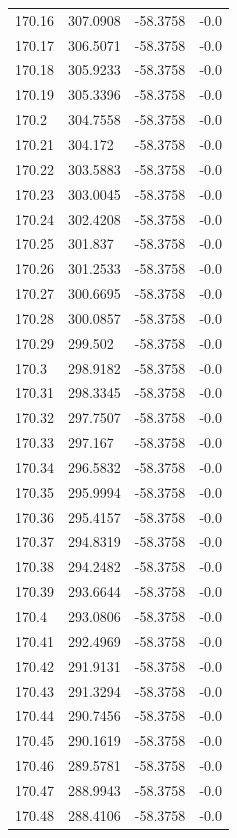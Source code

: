 \begin{table}[H]
\begin{tabular}{llll}
170.16 & 307.0908 & -58.3758 & -0.0 \\
170.17 & 306.5071 & -58.3758 & -0.0 \\
170.18 & 305.9233 & -58.3758 & -0.0 \\
170.19 & 305.3396 & -58.3758 & -0.0 \\
170.2 & 304.7558 & -58.3758 & -0.0 \\
170.21 & 304.172 & -58.3758 & -0.0 \\
170.22 & 303.5883 & -58.3758 & -0.0 \\
170.23 & 303.0045 & -58.3758 & -0.0 \\
170.24 & 302.4208 & -58.3758 & -0.0 \\
170.25 & 301.837 & -58.3758 & -0.0 \\
170.26 & 301.2533 & -58.3758 & -0.0 \\
170.27 & 300.6695 & -58.3758 & -0.0 \\
170.28 & 300.0857 & -58.3758 & -0.0 \\
170.29 & 299.502 & -58.3758 & -0.0 \\
170.3 & 298.9182 & -58.3758 & -0.0 \\
170.31 & 298.3345 & -58.3758 & -0.0 \\
170.32 & 297.7507 & -58.3758 & -0.0 \\
170.33 & 297.167 & -58.3758 & -0.0 \\
170.34 & 296.5832 & -58.3758 & -0.0 \\
170.35 & 295.9994 & -58.3758 & -0.0 \\
170.36 & 295.4157 & -58.3758 & -0.0 \\
170.37 & 294.8319 & -58.3758 & -0.0 \\
170.38 & 294.2482 & -58.3758 & -0.0 \\
170.39 & 293.6644 & -58.3758 & -0.0 \\
170.4 & 293.0806 & -58.3758 & -0.0 \\
170.41 & 292.4969 & -58.3758 & -0.0 \\
170.42 & 291.9131 & -58.3758 & -0.0 \\
170.43 & 291.3294 & -58.3758 & -0.0 \\
170.44 & 290.7456 & -58.3758 & -0.0 \\
170.45 & 290.1619 & -58.3758 & -0.0 \\
170.46 & 289.5781 & -58.3758 & -0.0 \\
170.47 & 288.9943 & -58.3758 & -0.0 \\
170.48 & 288.4106 & -58.3758 & -0.0 \\

\end{tabular}
\end{table}
